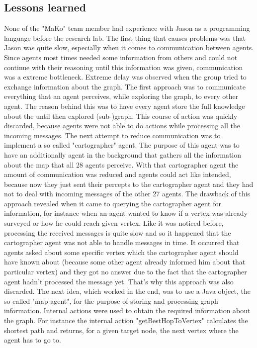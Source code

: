 \subsection{Lessons learned}
None of the "MaKo" team member had experience with Jason as a programming language before the research lab. The first thing that causes problems was that Jason was quite slow, especially when it comes to communication between agents. Since agents most times needed some information from others and could not continue with their reasoning until this information was given, communication was a extreme bottleneck. Extreme delay was observed when the group tried to exchange information about the graph. The first approach was to communicate everything that an agent perceives, while exploring the graph, to every other agent. The reason behind this was to have every agent store the full knowledge about the until then explored (sub-)graph. This course of action was quickly discarded, because agents were not able to do actions while processing all the incoming messages. The next attempt to reduce communication was to implement a so called "cartographer" agent. The purpose of this agent was to have an additionally agent in the background that gathers all the information about the map that all 28 agents perceive. With that cartographer agent the amount of communication was reduced and agents could act like intended, because now they just sent their percepts to the cartographer agent and they had not to deal with incoming messages of the other 27 agents. The drawback of this approach revealed when it came to querying the cartographer agent for information, for instance when an agent wanted to know if a vertex was already surveyed or how he could reach given vertex. Like it was noticed before, processing the received messages is quite slow and so it happened that the cartographer agent was not able to handle messages in time. It occurred that agents asked about some specific vertex which the cartographer agent should have known about (because some other agent already informed him about that particular vertex) and they got no answer due to the fact that the cartographer agent hadn't processed the message yet. That's why this approach was also discarded. The next idea, which worked in the end, was to use a Java object, the so called "map agent", for the purpose of storing and processing graph information. Internal actions were used to obtain the required information about the graph. For instance the internal action "getBestHopToVertex" calculates the shortest path and returns, for a given target node, the next vertex where the agent has to go to. 